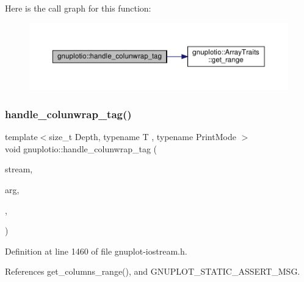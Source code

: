 Here is the call graph for this function\+:\nopagebreak
\begin{figure}[H]
\begin{center}
\leavevmode
\includegraphics[width=350pt]{namespacegnuplotio_aef147f3d42f3f2c89cc4c895b8494150_cgraph}
\end{center}
\end{figure}
\mbox{\label{namespacegnuplotio_a3b8981d3f39de8a058b5f18484f06c3c}} 
\subsubsection{\texorpdfstring{handle\+\_\+colunwrap\+\_\+tag()}{handle\_colunwrap\_tag()}\hspace{0.1cm}{\footnotesize\ttfamily [2/2]}}
{\footnotesize\ttfamily template$<$size\+\_\+t Depth, typename T , typename Print\+Mode $>$ \\
void gnuplotio\+::handle\+\_\+colunwrap\+\_\+tag (\begin{DoxyParamCaption}\item[{std\+::ostream \&}]{stream,  }\item[{const T \&}]{arg,  }\item[{\hyperlink{structgnuplotio_1_1_col_unwrap_yes}{Col\+Unwrap\+Yes}}]{,  }\item[{Print\+Mode}]{ }\end{DoxyParamCaption})}



Definition at line 1460 of file gnuplot-\/iostream.\+h.



References get\+\_\+columns\+\_\+range(), and G\+N\+U\+P\+L\+O\+T\+\_\+\+S\+T\+A\+T\+I\+C\+\_\+\+A\+S\+S\+E\+R\+T\+\_\+\+M\+SG.

